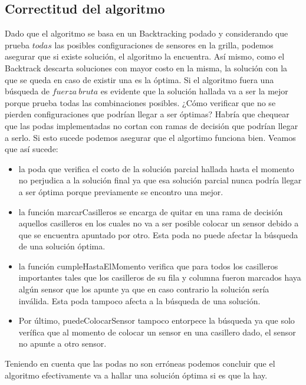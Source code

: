\subsection{Correctitud del algoritmo}

Dado que el algoritmo se basa en un Backtracking podado y considerando que prueba $todas$ las posibles configuraciones de sensores en la grilla, podemos asegurar que si existe soluci\'on, el algoritmo la encuentra. As\'i mismo, como el Backtrack descarta soluciones con mayor costo en la misma, la soluci\'on con la que se queda en caso de existir una es la \'optima.
Si el algoritmo fuera una búsqueda de $fuerza \ bruta$ es evidente que la solución hallada va a ser la mejor porque prueba todas las combinaciones posibles. ¿Cómo verificar que no se pierden configuraciones que podrían llegar a ser óptimas? Habría que chequear que las podas implementadas no cortan con ramas de decisión que podrían llegar a serlo. Si esto sucede podemos asegurar que el algortimo funciona bien. Veamos que así sucede:
\begin{itemize}
	\item la poda que verifica el costo de la solución parcial hallada hasta el momento no perjudica a la solución final ya que esa solución parcial nunca podría llegar a ser óptima porque previamente se encontro una mejor.
	\item la función marcarCasilleros se encarga de quitar en una rama de decisión aquellos casilleros en los cuales no va a ser posible colocar un sensor debido a que se encuentra apuntado por otro. Esta poda no puede afectar la búsqueda de una solución óptima.
	\item la función cumpleHastaElMomento verifica que para todos los casilleros importantes tales que los casilleros de su fila y columna fueron marcados haya algún sensor que los apunte ya que en caso contrario la solución sería inválida. Esta poda tampoco afecta a la búsqueda de una solución.
	\item Por último, puedeColocarSensor tampoco entorpece la búsqueda ya que solo verífica que al momento de colocar un sensor en una casillero dado, el sensor no apunte a otro sensor. 
\end{itemize}
Teniendo en cuenta que las podas no son erróneas podemos concluir que el algoritmo efectivamente va a hallar una solución óptima si es que la hay.

